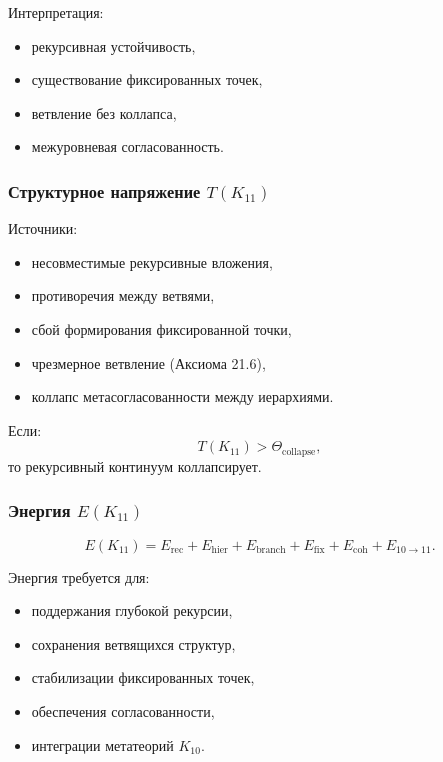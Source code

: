 Интерпретация:
\begin{itemize}
    \item рекурсивная устойчивость,
    \item существование фиксированных точек,
    \item ветвление без коллапса,
    \item межуровневая согласованность.
\end{itemize}

\subsubsection{Структурное напряжение $T(K_{11})$}

Источники:
\begin{itemize}
    \item несовместимые рекурсивные вложения,
    \item противоречия между ветвями,
    \item сбой формирования фиксированной точки,
    \item чрезмерное ветвление (Аксиома 21.6),
    \item коллапс метасогласованности между иерархиями.
\end{itemize}

Если:
\[
T(K_{11}) > \Theta_{\mathrm{collapse}},
\]
то рекурсивный континуум коллапсирует.

\subsubsection{Энергия $E(K_{11})$}

\[
E(K_{11})=
E_{\mathrm{rec}}+
E_{\mathrm{hier}}+
E_{\mathrm{branch}}+
E_{\mathrm{fix}}+
E_{\mathrm{coh}}+
E_{10\to11}.
\]

Энергия требуется для:
\begin{itemize}
    \item поддержания глубокой рекурсии,
    \item сохранения ветвящихся структур,
    \item стабилизации фиксированных точек,
    \item обеспечения согласованности,
    \item интеграции метатеорий $K_{10}$.
\end{itemize}

